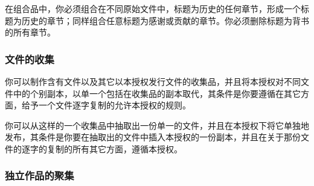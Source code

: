 
在组合品中，你必须组合在不同原始文件中，标题为历史的任何章节，形成一个标题为历史的章节；同样组合任意标题为感谢或贡献的章节。你必须删除标题为背书的所有章节。

\subsubsection{文件的收集}


你可以制作含有文件以及其它以本授权发行文件的收集品，并且将本授权对不同文件中的个别副本，以单一个包括在收集品的副本取代，其条件是你要遵循在其它方面，给予一个文件逐字复制的允许本授权的规则。


你可以从这样的一个收集品中抽取出一份单一的文件，并且在本授权下将它单独地发布，其条件是你要在抽取出的文件中插入本授权的一份副本，并且在关于那份文件的逐字的复制的所有其它方面，遵循本授权。


\subsubsection{独立作品的聚集}


